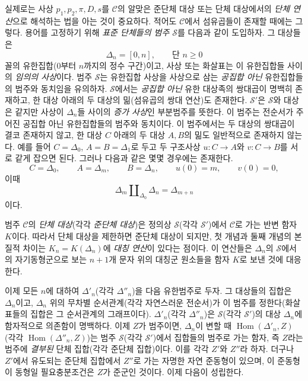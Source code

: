 실제로는 사상 $p_1,p_2,\pi,D,s$를 $\mathcal C$의 알맞은 준단체 대상
또는 단체 대상에서의 \emph{단체 연산}으로 해석하는 법을 아는 것이
중요하다. 적어도 $\mathcal C$에서 섬유곱들이 존재할 때에는 그렇다.
용어를 고정하기 위해 \emph{표준 단체들의 범주 $\mathcal S$}를 다음과
같이 도입하자. 그 대상들은
\[
  \Delta_n=[0,n],\qquad\text{단 }n\geq 0
\]
꼴의 유한집합($0$부터 $n$까지의 정수 구간)이고, 사상 또는 화살표는 이
유한집합들 사이의 \emph{임의의 사상}이다. 범주 $\mathcal S$는 유한집합
사상을 사상으로 삼는 \emph{공집합 아닌} 유한집합들의 범주와 동치임을
유의하자. $\mathcal S$에서는 \emph{공집합 아닌} 유한 대상족의 쌍대곱이
명백히 존재하고, 한 대상 아래의 두 대상의 밂(섬유곱의 쌍대 연산)도
존재한다. $\mathcal S'$은 $\mathcal S$와 대상은 같지만 사상이
$\Delta_n$들 사이의 \emph{증가 사상}인 부분범주를 뜻한다. 이 범주는
전순서가 주어진 공집합 아닌 유한집합들의 범주와 동치이다. 이 범주에서는
두 대상의
쌍대곱이 결코 존재하지 않고, 한 대상 $C$ 아래의 두 대상 $A,B$의 밂도
일반적으로 존재하지 않는다. 예를 들어 $C=\Delta_0$, $A=B=\Delta_1$로
두고 두 구조사상 $u:C\to A$와 $v:C\to B$를 서로 같게 잡으면 된다.
그러나 다음과 같은 몇몇 경우에는 존재한다.
\[
  C=\Delta_0,\qquad A=\Delta_m,\qquad B=\Delta_n,\qquad
  u(0)=m,\qquad v(0)=0,
\]
이때
\[
  \Delta_m\amalg_{\Delta_0}\Delta_n=\Delta_{m+n}
\]
이다.

범주 $\mathcal C$의 \emph{단체 대상}(각각 \emph{준단체 대상})은 정의상
$\mathcal S$(각각 $\mathcal S'$)에서 $\mathcal C$로 가는 반변 함자
$K$이다. 따라서 단체 대상을 제한하면 준단체 대상이 되지만, 첫 개념과
둘째 개념의 본질적 차이는 $K_n=K(\Delta_n)$에 \emph{대칭 연산}이 있다는
점이다. 이 연산들은 $\Delta_n$의 $\mathcal S$에서의 자기동형군으로 보는
$n+1$개 문자 위의 대칭군 원소들을 함자 $K$로 보낸 것에 대응한다.

이제 모든 $n$에 대하여 $\Delta'_n$(각각 $\Delta''_n$)을 다음 유한범주로
두자. 그 대상들의 집합은 $\Delta_n$이고, $\Delta_n$ 위의 무차별
순서관계(각각 자연스러운 전순서)가 이 범주를 정한다(화살표들의 집합은 그
순서관계의 그래프이다). $\Delta'_n$(각각 $\Delta''_n$)은 $\mathcal
S$(각각 $\mathcal S'$)의 대상 $\Delta_n$에 함자적으로 의존함이 명백하다.
이제 $Z$가 범주이면, $\Delta_n$이 변할 때
$\operatorname{Hom}(\Delta'_n,Z)$(각각
$\operatorname{Hom}(\Delta''_n,Z)$)는 범주 $\mathcal S$(각각 $\mathcal
S'$)에서 집합들의 범주로 가는 함자, 즉 $Z$라는 범주에 \emph{결부된}
단체 집합(각각 준단체 집합)이다. 이를 각각 $Z'$와 $Z''$라 하자. 더구나
$Z'$에서 유도되는 준단체 집합에서 $Z''$로 가는 자명한 자연 준동형이
있으며, 이 준동형이 동형일 필요충분조건은 $Z$가 준군인 것이다. 이제
다음이 성립한다.

